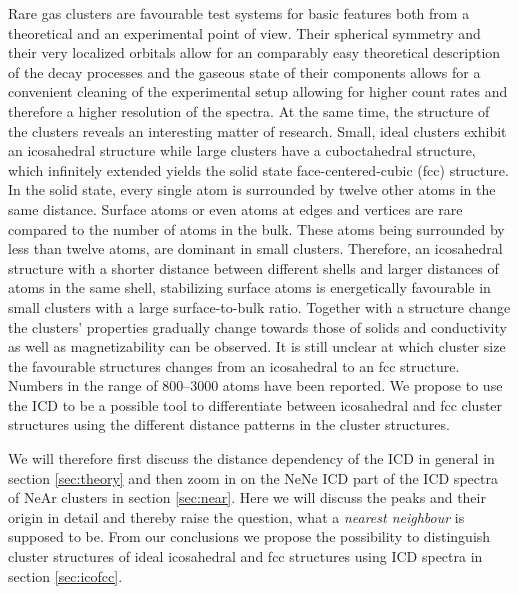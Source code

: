 Rare gas clusters are favourable test systems for basic features both
from a theoretical and an experimental point of view. Their spherical
symmetry and their very localized orbitals allow for an comparably easy
theoretical description of the decay processes and the gaseous state
of their components allows for a convenient cleaning of the experimental
setup allowing for higher count rates and therefore a higher resolution
of the spectra. At the same time, the structure of the clusters reveals an
interesting matter of research. Small, ideal clusters exhibit an icosahedral
structure while large clusters have a cuboctahedral structure, which
infinitely extended yields the solid state face-centered-cubic (fcc) structure.
In the solid state, every single atom is surrounded by twelve other atoms in the
same distance. Surface atoms or even atoms at edges and vertices are rare
compared to the number of atoms in the bulk. These atoms being surrounded
by less than twelve atoms, are dominant in small clusters. Therefore,
an icosahedral structure with a shorter distance between different shells and
larger distances of atoms in the same shell, stabilizing surface atoms is
energetically favourable in small clusters with a large surface-to-bulk ratio.
Together with a structure change
the clusters' properties gradually change towards those of solids and
conductivity as well as magnetizability can be observed. \cite{Benfield92}
It is still unclear at which cluster size the favourable structures changes from
an icosahedral to an fcc structure. Numbers in the range of 800--3000 atoms
have been reported. \cite{Hartke02,Pahl08}
We propose to use the ICD to be a possible tool to differentiate between
icosahedral and fcc cluster structures using the different distance
patterns in the cluster structures.

We will
therefore first discuss the distance dependency of the ICD in general
in section \ref{sec:theory} and then
zoom in on the NeNe ICD part of the ICD spectra of NeAr clusters
\cite{Fasshauer14_1} in section \ref{sec:near}. Here we will discuss the
peaks and their origin in detail and thereby
raise the question, what a \emph{nearest neighbour} is supposed to be. From
our conclusions we propose the possibility to distinguish cluster structures
of ideal icosahedral and fcc structures using ICD spectra in
section \ref{sec:icofcc}.

